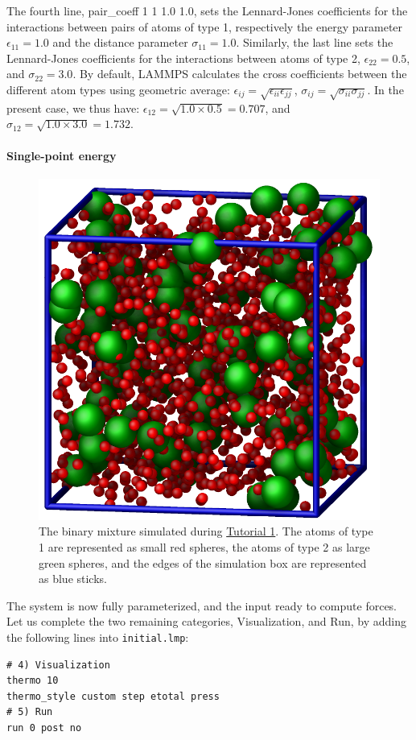 \documentclass[9pt,tutorial]{livecoms}
\newcommand{\lmpcmd}[1]{\hspace{0pt}\colorbox{listing}{\textcolor{command}{\small{#1}}}\hspace{0pt}} %
\newcommand{\flecmd}[1]{\textcolor{command}{\texttt{#1}}} %
\begin{document}
The fourth line, \lmpcmd{pair\_coeff 1 1 1.0 1.0}, sets the
Lennard-Jones coefficients for the interactions between pairs of atoms
of type 1, respectively the energy parameter $\epsilon_{11} = 1.0$ and
the distance parameter $\sigma_{11} = 1.0$.  Similarly, the last line
sets the Lennard-Jones coefficients for the interactions between atoms
of type 2, $\epsilon_{22} = 0.5$, and $\sigma_{22} = 3.0$.  By default,
LAMMPS calculates the cross coefficients between the different atom
types using geometric average:
$\epsilon_{ij} = \sqrt{\epsilon_{ii} \epsilon_{jj}}$,
$\sigma_{ij} = \sqrt{\sigma_{ii} \sigma_{jj}}$.  In the present case, we
thus have: $\epsilon_{12} = \sqrt{1.0 \times 0.5} = 0.707$, and
$\sigma_{12} = \sqrt{1.0 \times 3.0} = 1.732$.

\paragraph{Single-point energy}

\begin{figure}
\centering
\includegraphics[width=0.55\linewidth]{LJ}
\caption{The binary mixture simulated during \hyperref[lennard-jones-label]{Tutorial 1}.
  The atoms of type 1 are represented as small red spheres, the atoms of type 2 as large
  green spheres, and the edges of the simulation box are represented as blue sticks.}
\label{fig:LJ}
\end{figure}

The system is now fully parameterized, and the input ready to compute
forces.  Let us complete the two remaining categories,
\lmpcmd{Visualization}, and \lmpcmd{Run}, by adding the following lines
into \flecmd{initial.lmp}:
\begin{lstlisting}
# 4) Visualization
thermo 10
thermo_style custom step etotal press
# 5) Run
run 0 post no
\end{lstlisting}
\end{document}
